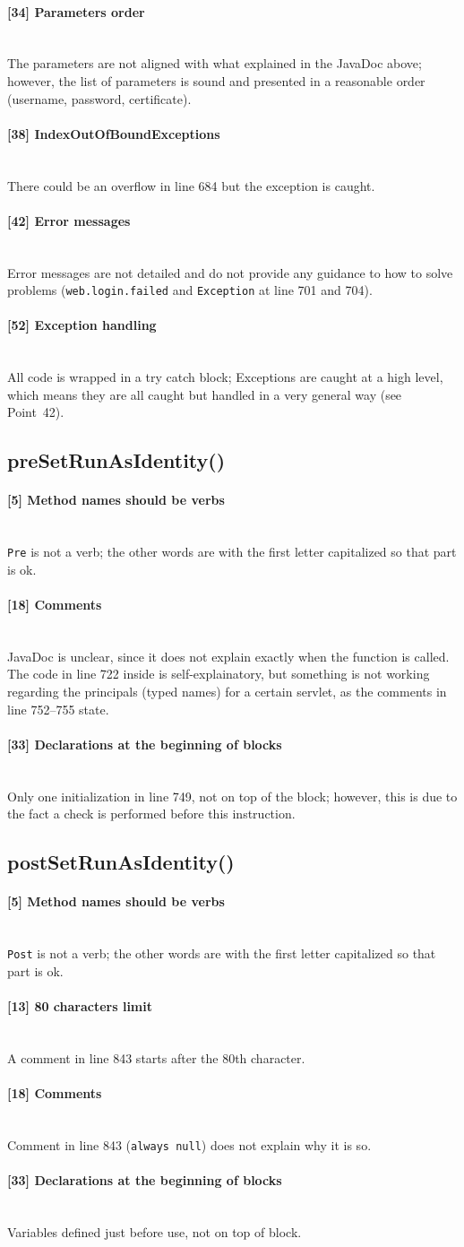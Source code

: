 \documentclass[a4paper, 11pt]{article}
\newcommand{\code}[1]{\texttt{#1}}
\newcommand{\issue}[3][?]{
    \paragraph{[#1] #2} \mbox{}\\ #3
}
\begin{document}
\issue[34]{Parameters order} {
    The parameters are not aligned with what explained in the JavaDoc above; 
    however, the list of parameters is sound and presented in a reasonable order (username, password, certificate). 
}

\issue[38]{IndexOutOfBoundExceptions} {
    There could be an overflow in line 684 but the exception is caught.
}

\issue[42]{Error messages} {
Error messages are not detailed and do not provide any guidance to 
how to solve problems (\code{web.login.failed} and \code{Exception} at
line 701 and 704).
}

\issue[52]{Exception handling} {
All code is wrapped in a try catch block; Exceptions are caught at a high level, 
which means they are all caught but handled in a very general way 
(see Point~42).
}

\subsection{preSetRunAsIdentity()}

\issue[5]{Method names should be verbs} {
    \code{Pre} is not a verb; the other words are with the first letter
    capitalized so that part is ok.
}

\issue[18]{Comments} {
JavaDoc is unclear, since it does not explain exactly when the function is 
called. The code in line 722 inside is self-explainatory, but something is 
not working regarding the principals (typed names) for a certain servlet, 
as the comments in line 752--755 state.
}
\issue[33]{Declarations at the beginning of blocks} {
Only one initialization in line 749, not on top of the block; however, 
this is due to the fact a check is performed before this instruction.
}

\subsection{postSetRunAsIdentity()}

\issue[5]{Method names should be verbs} {
    \code{Post} is not a verb; the other words are with the first letter
    capitalized so that part is ok.
}

\issue[13]{80 characters limit} {
    A comment in line 843 starts after the 80th character.
}

\issue[18]{Comments} {
    Comment in line 843 (\code{always null}) does not explain why it is so.
}

\issue[33]{Declarations at the beginning of blocks} {
    Variables defined just before use, not on top of block.
}
\end{document}
